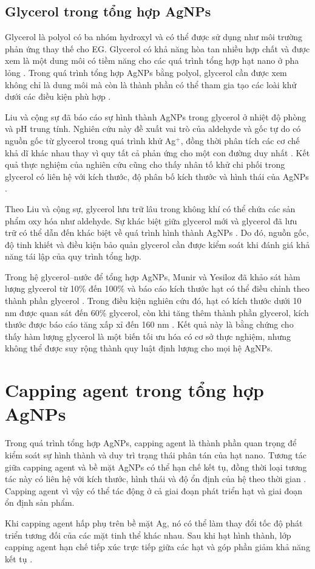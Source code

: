 \subsection{Glycerol trong tổng hợp AgNPs}
Glycerol là polyol có ba nhóm hydroxyl và có thể được sử dụng như môi trường phản ứng thay thế cho EG.
Glycerol có khả năng hòa tan nhiều hợp chất và được xem là một dung môi có tiềm năng cho các quá trình tổng hợp hạt nano ở pha lỏng \parencite{munir2023}.
Trong quá trình tổng hợp AgNPs bằng polyol, glycerol cần được xem không chỉ là dung môi mà còn là thành phần có thể tham gia tạo các loài khử dưới các điều kiện phù hợp \parencite{liu2020glycerol}.
\par
Liu và cộng sự đã báo cáo sự hình thành AgNPs trong glycerol ở nhiệt độ phòng và pH trung tính.
Nghiên cứu này đề xuất vai trò của aldehyde và gốc tự do có nguồn gốc từ glycerol trong quá trình khử Ag$^+$, đồng thời phân tích các cơ chế khả dĩ khác nhau thay vì quy tất cả phản ứng cho một con đường duy nhất \parencite{liu2020glycerol}.
Kết quả thực nghiệm của nghiên cứu cũng cho thấy nhân tố khử chi phối trong glycerol có liên hệ với kích thước, độ phân bố kích thước và hình thái của AgNPs \parencite{liu2020glycerol}.
\par
Theo Liu và cộng sự, glycerol lưu trữ lâu trong không khí có thể chứa các sản phẩm oxy hóa như aldehyde.
Sự khác biệt giữa glycerol mới và glycerol đã lưu trữ có thể dẫn đến khác biệt về quá trình hình thành AgNPs \parencite{liu2020glycerol}.
Do đó, nguồn gốc, độ tinh khiết và điều kiện bảo quản glycerol cần được kiểm soát khi đánh giá khả năng tái lập của quy trình tổng hợp.
\par
Trong hệ glycerol--nước để tổng hợp AgNPs, Munir và Yesiloz đã khảo sát hàm lượng glycerol từ 10\% đến 100\% và báo cáo kích thước hạt có thể điều chỉnh theo thành phần glycerol \parencite{munir2023}.
Trong điều kiện nghiên cứu đó, hạt có kích thước dưới 10 nm được quan sát đến 60\% glycerol, còn khi tăng thêm thành phần glycerol, kích thước được báo cáo tăng xấp xỉ đến 160 nm \parencite{munir2023}.
Kết quả này là bằng chứng cho thấy hàm lượng glycerol là một biến tối ưu hóa có cơ sở thực nghiệm, nhưng không thể được suy rộng thành quy luật định lượng cho mọi hệ AgNPs.

\section{Capping agent trong tổng hợp AgNPs}
Trong quá trình tổng hợp AgNPs, capping agent là thành phần quan trọng để kiểm soát sự hình thành và duy trì trạng thái phân tán của hạt nano.
Tương tác giữa capping agent và bề mặt AgNPs có thể hạn chế kết tụ, đồng thời loại tương tác này có liên hệ với kích thước, hình thái và độ ổn định của hệ theo thời gian \parencite{restrepo2021}.
Capping agent vì vậy có thể tác động ở cả giai đoạn phát triển hạt và giai đoạn ổn định sản phẩm.
\par
Khi capping agent hấp phụ trên bề mặt Ag, nó có thể làm thay đổi tốc độ phát triển tương đối của các mặt tinh thể khác nhau.
Sau khi hạt hình thành, lớp capping agent hạn chế tiếp xúc trực tiếp giữa các hạt và góp phần giảm khả năng kết tụ \parencite{restrepo2021,wiley2005}.
